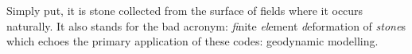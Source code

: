 
Simply put, it is stone collected from the surface of fields where it 
occurs naturally. It also stands for the bad acronym: {\sl fi}nite 
{\sl el}ement {\sl d}eformation of {\sl stone}s which echoes the primary 
application of these codes: geodynamic modelling.
